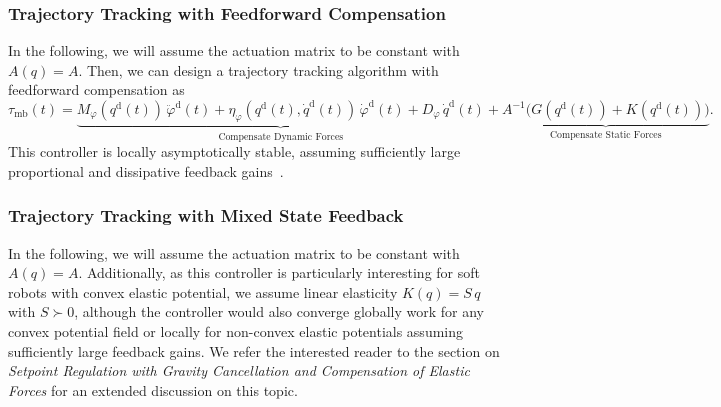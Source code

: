 \subsubsection{Trajectory Tracking with Feedforward Compensation}
In the following, we will assume the actuation matrix to be constant with $A(q) = A$. Then, we can design a trajectory tracking algorithm with feedforward compensation as~\citep{kelly1994pd, della2023model}
\begin{equation}
    \tau_\mathrm{mb}(t) =  \underbrace{M_\varphi(q^\mathrm{d}(t)) \, \ddot{\varphi}^\mathrm{d}(t) + \eta_\varphi(q^\mathrm{d}(t),\dot{q}^\mathrm{d}(t)) \, \dot{\varphi}^\mathrm{d}(t) + D_\varphi \, \dot{q}^\mathrm{d}(t)}_\text{Compensate Dynamic Forces} + \underbrace{ A^{-1} \big ( G(q^\mathrm{d}(t)) + K(q^\mathrm{d}(t)) \big )}_\text{Compensate Static Forces}.
\end{equation}
This controller is locally asymptotically stable, assuming sufficiently large proportional and dissipative feedback gains~\citep{della2023model}.

\subsubsection{Trajectory Tracking with Mixed State Feedback}
In the following, we will assume the actuation matrix to be constant with $A(q) = A$.
Additionally, as this controller is particularly interesting for soft robots with convex elastic potential, we assume linear elasticity $K(q) = S \, q$ with $S \succ 0$, although the controller would also converge globally work for any convex potential field or locally for non-convex elastic potentials assuming sufficiently large feedback gains. We refer the interested reader to the section on \emph{Setpoint Regulation with Gravity Cancellation and Compensation of Elastic Forces} for an extended discussion on this topic.

